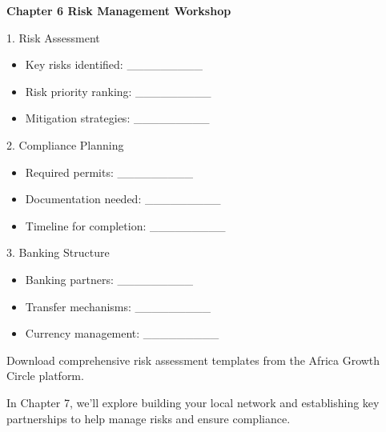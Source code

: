\begin{workshopbox}
\textbf{Chapter 6 Risk Management Workshop}

1. Risk Assessment
\begin{itemize}
    \item Key risks identified: \_\_\_\_\_\_\_\_\_
    \item Risk priority ranking: \_\_\_\_\_\_\_\_\_
    \item Mitigation strategies: \_\_\_\_\_\_\_\_\_
\end{itemize}

2. Compliance Planning
\begin{itemize}
    \item Required permits: \_\_\_\_\_\_\_\_\_
    \item Documentation needed: \_\_\_\_\_\_\_\_\_
    \item Timeline for completion: \_\_\_\_\_\_\_\_\_
\end{itemize}

3. Banking Structure
\begin{itemize}
    \item Banking partners: \_\_\_\_\_\_\_\_\_
    \item Transfer mechanisms: \_\_\_\_\_\_\_\_\_
    \item Currency management: \_\_\_\_\_\_\_\_\_
\end{itemize}

Download comprehensive risk assessment templates from the Africa Growth Circle platform.
\end{workshopbox}

\begin{importantbox}
In Chapter 7, we'll explore building your local network and establishing key partnerships to help manage risks and ensure compliance.
\end{importantbox}